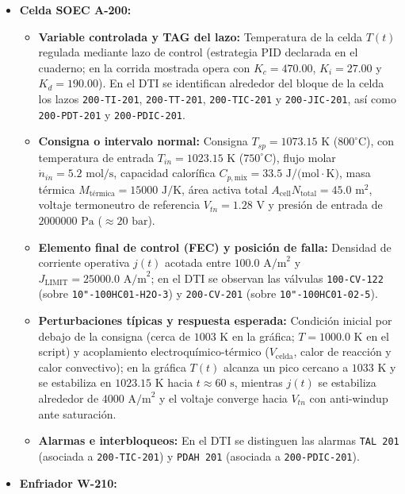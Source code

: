 \documentclass[11pt,letterpaper]{article}
\begin{document}
\begin{itemize}
\item \textbf{Celda SOEC A-200:}
\begin{itemize}
    \item \textbf{Variable controlada y TAG del lazo:} Temperatura de la celda $T(t)$ regulada mediante lazo de control (estrategia PID declarada en el cuaderno; en la corrida mostrada opera con $K_c = 470.00$, $K_i = 27.00$ y $K_d = 190.00$). En el DTI se identifican alrededor del bloque de la celda los lazos \texttt{200-TI-201}, \texttt{200-TT-201}, \texttt{200-TIC-201} y \texttt{200-JIC-201}, así como \texttt{200-PDT-201} y \texttt{200-PDIC-201}.
    \item \textbf{Consigna o intervalo normal:} Consigna $T_{sp} = 1073.15\text{ K}$ ($800^\circ\text{C}$), con temperatura de entrada $T_{in} = 1023.15\text{ K}$ ($750^\circ\text{C}$), flujo molar $\dot{n}_{in} = 5.2\text{ mol/s}$, capacidad calorífica $C_{p,\text{mix}} = 33.5\text{ J/(mol}\cdot\text{K)}$, masa térmica $M_{\text{térmica}} = 15000\text{ J/K}$, área activa total $A_{\text{cell}}N_{\text{total}} = 45.0\text{ m}^2$, voltaje termoneutro de referencia $V_{tn} = 1.28\text{ V}$ y presión de entrada de $2000000\text{ Pa}$ ($\approx 20\text{ bar}$).
    \item \textbf{Elemento final de control (FEC) y posición de falla:} Densidad de corriente operativa $j(t)$ acotada entre $100.0\text{ A/m}^2$ y $J_{\text{LIMIT}} = 25000.0\text{ A/m}^2$; en el DTI se observan las válvulas \texttt{100-CV-122} (sobre \texttt{10"-100HC01-H2O-3}) y \texttt{200-CV-201} (sobre \texttt{10"-100HC01-02-5}).
    \item \textbf{Perturbaciones típicas y respuesta esperada:} Condición inicial por debajo de la consigna (cerca de $1003\text{ K}$ en la gráfica; $T = 1000.0\text{ K}$ en el script) y acoplamiento electroquímico-térmico ($V_{\text{celda}}$, calor de reacción y calor convectivo); en la gráfica $T(t)$ alcanza un pico cercano a $1033\text{ K}$ y se estabiliza en $1023.15\text{ K}$ hacia $t \approx 60\text{ s}$, mientras $j(t)$ se estabiliza alrededor de $4000\text{ A/m}^2$ y el voltaje converge hacia $V_{tn}$ con anti-windup ante saturación.
    \item \textbf{Alarmas e interbloqueos:} En el DTI se distinguen las alarmas \texttt{TAL 201} (asociada a \texttt{200-TIC-201}) y \texttt{PDAH 201} (asociada a \texttt{200-PDIC-201}).
\end{itemize}
\item \textbf{Enfriador W-210:}
\begin{itemize}

\end{itemize}
\end{itemize}
\end{document}
